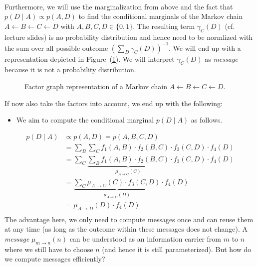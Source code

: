 \\[.1cm]%
Furthermore, we will use the marginalization from above and the fact that \ensuremath{p(D\mid A) \propto p(A,D)} to find the conditional marginals of the Markov chain \ensuremath{A \leftarrow B \leftarrow C \leftarrow D} with \ensuremath{A,B,C,D\in\{0,1\}}. %
The resulting term \ensuremath{\gamma_C(D)} (cf. lecture slides) is no probability distribution and hence need to be normlized with the sum over all possible outcome \ensuremath{\left(\sum_D\gamma_C(D)\right)^{-1}}.
We will end up with a representation depicted in Figure~(\ref{fig:factor_graph_MC}). %
We will interpret \ensuremath{\gamma_C(D)} as \emph{message} because it is not a probability distribution. %
\begin{figure}[H]
\centering{}
\caption{Factor graph representation of a Markov chain \ensuremath{A\leftarrow B\leftarrow C\leftarrow D}.}
\label{fig:factor_graph_MC}
\end{figure}
If now also take the factors into account, we end up with the following: %
\begin{itemize}
	\item We aim to compute the conditional marginal \ensuremath{p(D\mid A)} as follows. %
\end{itemize}
\begin{equation}
\begin{aligned}
p(D\mid A) &\propto p(A,D) = p(A,B,C,D)\\
&= \sum_B \sum_C f_1(A,B)\cdot f_2(B,C)\cdot f_3(C,D)\cdot f_4(D)\\
&= \sum_C \underbrace{\sum_B f_1(A,B)\cdot f_2(B,C)}_{\mu_{A\rightarrow C}(C)}\cdot f_3(C,D)\cdot f_4(D)\\
&= \underbrace{\sum_C \mu_{A\rightarrow C}(C)\cdot f_3(C,D)}_{\mu_{A\rightarrow D}(D)}\cdot f_4(D)\\
&= \mu_{A\rightarrow D}(D)\cdot f_4(D)\\
\end{aligned}
\end{equation}
The advantage here, we only need to compute messages once and can reuse them at any time (as long as the outcome within these messages does not change). %
A \emph{message} \ensuremath{\mu_{m\rightarrow n}(n)} can be understood as an information carrier from \ensuremath{m} to \ensuremath{n} where we still have to choose \ensuremath{n} (and hence it is still parameterized). %
But how do we compute messages efficiently? %
%
%
%
